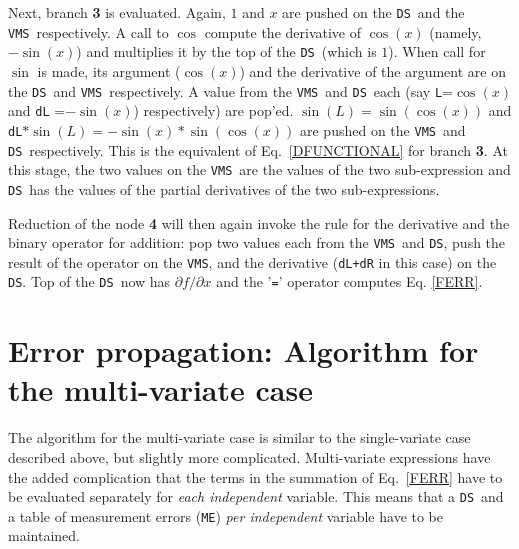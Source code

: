 \documentclass[12pt]{article}
\newcommand{\DS}{{\tt DS}}
\newcommand{\VMS}{{\tt VMS}}
\begin{document}
Next, branch {\bf 3} is evaluated.  Again, $1$ and $x$ are pushed on
the \DS\ and the \VMS\ respectively.  A call to $\cos$ compute the
derivative of $\cos(x)$ (namely, $-\sin(x)$) and multiplies it by the
top of the \DS\ (which is $1$).  When call for $\sin$ is made, its
argument ($\cos(x)$) and the derivative of the argument are on the
\DS\ and \VMS\ respectively. A value from the \VMS\ and \DS\ each (say
{\tt L}=$\cos(x)$ and {\tt dL} =$-\sin(x)$) respectively) are pop'ed.
$\sin(L)=\sin(\cos(x))$ and {\tt dL}$*\sin(L)=-\sin(x)*\sin(\cos(x))$
are pushed on the \VMS\ and \DS\ respectively.  This is the equivalent
of Eq.~\ref{DFUNCTIONAL} for branch {\bf 3}.  At this stage, the two
values on the \VMS\ are the values of the two sub-expression and \DS\
has the values of the partial derivatives of the two sub-expressions.

Reduction of the node {\bf 4} will then again invoke the rule for the
derivative and the binary operator for addition: pop two values each
from the \VMS\ and \DS, push the result of the operator on the \VMS,
and the derivative ({\tt dL+dR} in this case) on the \DS.  Top of the
\DS\ now has $\partial f / \partial x$ and the '{\tt=}' operator
computes Eq. \ref{FERR}.

\section{Error propagation: Algorithm for the multi-variate case}
\label{SEC:MULTI_VAR}

The algorithm for the multi-variate case is similar to the
single-variate case described above, but slightly more complicated.
Multi-variate expressions have the added complication that the terms
in the summation of Eq.~\ref{FERR} have to be evaluated separately for
{\it each independent} variable.  This means that a \DS\ and a table
of measurement errors ({\tt ME}) {\it per independent} variable have
to be maintained.
\end{document}
